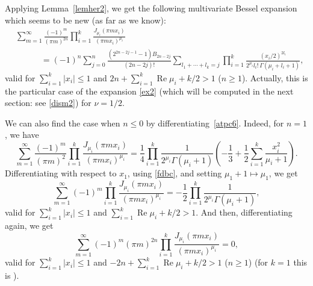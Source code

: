 \documentclass[12pt,leqno]{amsart}
\numberwithin{equation}{section}
\theoremstyle{plain}
\renewcommand{\Re}{\operatorname{Re}}
\begin{document}
Applying Lemma~\ref{lemher2}, we get the following multivariate Bessel expansion which seems to be new (as far as we know):
\begin{align}
\label{atpc6}
& \sum_{m=1}^{\infty} \frac{(-1)^m}{(\pi m)^{2n}} 
\prod_{i=1}^k\frac{J_{\mu_i}(\pi mx_i)}{(\pi mx_i)^{\mu_i}} \\
\nonumber
&\qquad\quad = (-1)^{n} \sum_{j=0}^{n}\frac{(2^{2n-2j-1}-1)B_{2n-2j}}{(2n-2j)!}
\sum_{l_1+\cdots+l_k=j} \prod_{i=1}^k\frac{(x_i/2)^{2l_i}}{2^{\mu_i}l_i!\, \Gamma(\mu_i+l_i+1)},
\end{align}
valid for $ \sum_{i=1}^k |x_i| \le 1$ and $2n+ \sum_{i=1}^k\Re \mu_i+k/2>1$ ($n\ge 1$).
Actually, this is the particular case of the expansion \eqref{ex2} (which will be computed in the next section: see \eqref{dism2}) for $\nu=1/2$.

We can also find the case when $n\le 0$ by differentiating~\eqref{atpc6}. Indeed, for $n=1$, we have
\[
\sum_{m=1}^{\infty} \frac{(-1)^m}{(\pi m)^{2}}
\prod_{i=1}^k\frac{J_{\mu_i}(\pi mx_i)}{(\pi mx_i)^{\mu_i}}
= \frac{1}{4}\prod_{i=1}^k\frac{1}{2^{\mu_i}\Gamma(\mu_i+1)}
\left(-\frac{1}{3}+\frac{1}{2} \sum_{i=1}^k\frac{x_i^2}{\mu_i+1}\right).
\]
Differentiating with respect to $x_1$, using \eqref{fdbc}, and setting $\mu_1+1 \mapsto \mu_1$, we get
\[
\sum_{m=1}^{\infty} (-1)^m \prod_{i=1}^k \frac{J_{\mu_i}(\pi mx_i)}{(\pi mx_i)^{\mu_i}}
= -\frac{1}{2} \prod_{i=1}^k\frac{1}{2^{\mu_i} \Gamma(\mu_i+1)},
\]
valid for $ \sum_{i=1}^k |x_i| \le 1$ and $ \sum_{i=1}^k\Re \mu_i+k/2>1$. And then, differentiating again, we get
\[
\sum_{m=1}^{\infty} (-1)^m(\pi m)^{2n} \prod_{i=1}^k \frac{J_{\mu_i}(\pi mx_i)}{(\pi mx_i)^{\mu_i}}=0,
\]
valid for $\sum_{i=1}^k |x_i| \le 1$ and $-2n+ \sum_{i=1}^k \Re \mu_i+k/2>1$ ($n\ge 1$) (for $k=1$ this is \cite[Identity (10), p.~678]{PBM1}).
\end{document}
